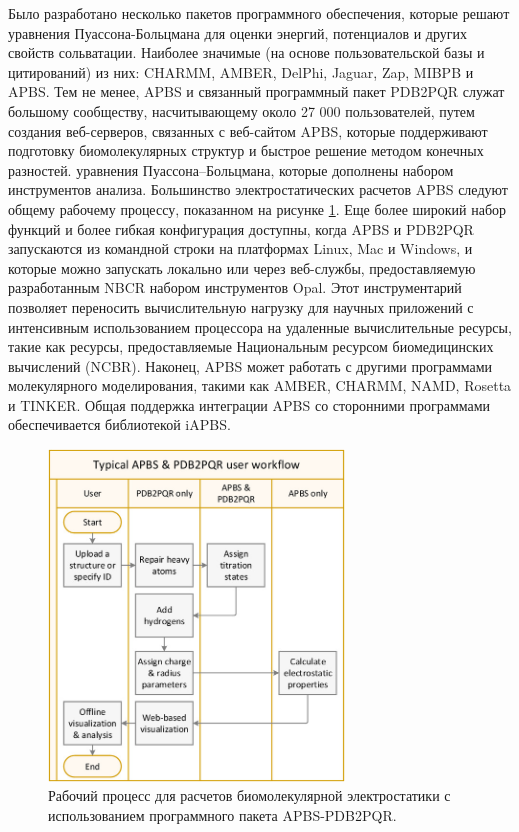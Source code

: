 Было разработано несколько пакетов программного обеспечения, которые решают уравнения Пуассона-Больцмана для оценки энергий, потенциалов и других свойств сольватации. Наиболее значимые (на основе пользовательской базы и цитирований) из них: CHARMM, AMBER, DelPhi, Jaguar, Zap, MIBPB и APBS. Тем не менее, APBS и связанный программный пакет PDB2PQR служат большому сообществу, насчитывающему около 27 000 пользователей, путем создания веб-серверов, связанных с веб-сайтом APBS, которые поддерживают подготовку биомолекулярных структур и быстрое решение методом конечных разностей. уравнения Пуассона–Больцмана, которые дополнены набором инструментов анализа. Большинство электростатических расчетов APBS следуют общему рабочему процессу, показанном на рисунке \ref{pdb2pqr}. Еще более широкий набор функций и более гибкая конфигурация доступны, когда APBS и PDB2PQR запускаются из командной строки на платформах Linux, Mac и Windows, и которые можно запускать локально или через веб-службы, предоставляемую разработанным NBCR набором инструментов Opal. Этот инструментарий позволяет переносить вычислительную нагрузку для научных приложений с интенсивным использованием процессора на удаленные вычислительные ресурсы, такие как ресурсы, предоставляемые Национальным ресурсом биомедицинских вычислений (NCBR). Наконец, APBS может работать с другими программами молекулярного моделирования, такими как AMBER, CHARMM, NAMD, Rosetta и TINKER. Общая поддержка интеграции APBS со сторонними программами обеспечивается библиотекой iAPBS.

\begin{figure}[h!]
\begin{center}
	\includegraphics[width=0.7\textwidth]{images/pdb2pqr.jpg}
	\caption{Рабочий процесс для расчетов биомолекулярной электростатики с использованием программного пакета APBS-PDB2PQR.}
    \label{pdb2pqr}
\end{center}
\end{figure}



